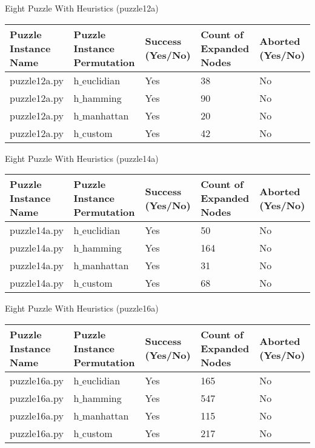 \documentclass[12pt]{exam}
\begin{document}
\begin{questions}
\begin{center}
    \tiny
    Eight Puzzle With Heuristics (puzzle12a)\\
    \begin{tabu} to 0.8\textwidth {  X[l] | X[l] | X[l] | X[l] | X[l]}
        \hline
        Puzzle Instance Name & Puzzle Instance Permutation & Success (Yes/No) & Count of Expanded Nodes & Aborted (Yes/No)\\
        \hline
            puzzle12a.py & h$\_$euclidian & Yes & 38 & No \\
        \hline
            puzzle12a.py & h$\_$hamming & Yes & 90 & No \\
        \hline
            puzzle12a.py & h$\_$manhattan & Yes & 20 & No \\
        \hline
            puzzle12a.py & h$\_$custom & Yes & 42 & No \\
        \hline
    \end{tabu}
\end{center}

\begin{center}
    \tiny
    Eight Puzzle With Heuristics (puzzle14a)\\
    \begin{tabu} to 0.8\textwidth {  X[l] | X[l] | X[l] | X[l] | X[l]}
        \hline
        Puzzle Instance Name & Puzzle Instance Permutation & Success (Yes/No) & Count of Expanded Nodes & Aborted (Yes/No)\\
        \hline
            puzzle14a.py & h$\_$euclidian & Yes & 50 & No \\
        \hline
            puzzle14a.py & h$\_$hamming & Yes & 164 & No \\
        \hline
            puzzle14a.py & h$\_$manhattan & Yes & 31 & No \\
        \hline
            puzzle14a.py & h$\_$custom & Yes & 68 & No \\
        \hline
    \end{tabu}
\end{center}

\begin{center}
    \tiny
    Eight Puzzle With Heuristics (puzzle16a)\\
    \begin{tabu} to 0.8\textwidth {  X[l] | X[l] | X[l] | X[l] | X[l]}
        \hline
        Puzzle Instance Name & Puzzle Instance Permutation & Success (Yes/No) & Count of Expanded Nodes & Aborted (Yes/No)\\
        \hline
            puzzle16a.py & h$\_$euclidian & Yes & 165 & No \\
        \hline
            puzzle16a.py & h$\_$hamming & Yes & 547 & No \\
        \hline
            puzzle16a.py & h$\_$manhattan & Yes & 115 & No \\
        \hline
            puzzle16a.py & h$\_$custom & Yes & 217 & No \\
        \hline
    \end{tabu}
\end{center}



\end{questions}
\end{document}
